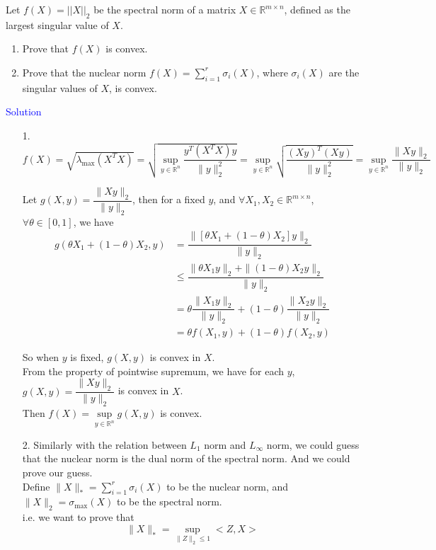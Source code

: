 Let $f(X) = ||X||_2$ be the spectral norm of a matrix $X \in \mathbb{R}^{m \times n}$, defined as the largest singular value of $X$.
\begin{enumerate}
\item Prove that $f(X)$ is convex. 

\item Prove that the nuclear norm $f(X) = \sum_{i=1}^{r} \sigma_i(X)$, where $\sigma_i(X)$ are the singular values of $X$, is convex. 
\end{enumerate}

\textcolor{blue}{Solution}

\begin{itemize}
\item[1.] $f(X)=\sqrt{\lambda_{\max}(X^TX)} = \sqrt{\sup\limits_{y\in\mathbb{R}^n}\dfrac{y^T(X^TX)y}{\|y\|_2^2}}= \sup\limits_{y\in\mathbb{R}^n}\sqrt{\dfrac{(Xy)^T(Xy)}{\|y\|_2^2}} = \sup\limits_{y\in\mathbb{R}^n}\dfrac{\|Xy\|_2}{\|y\|_2}$

Let $g(X,y)=\dfrac{\|Xy\|_2}{\|y\|_2}$, then for a fixed $y$, and $\forall X_1, X_2\in\mathbb{R}^{m\times n}$, $\forall \theta\in[0,1]$, we have
\begin{align*}
g(\theta X_1+(1-\theta)X_2,y) &= \dfrac{\|\left[\theta X_1+(1-\theta)X_2\right]y\|_2}{\|y\|_2} \\
&\leq \dfrac{\|\theta X_1y\|_2+\|(1-\theta)X_2y\|_2}{\|y\|_2} \\
&= \theta\dfrac{\|X_1y\|_2}{\|y\|_2}+(1-\theta)\dfrac{\|X_2y\|_2}{\|y\|_2} \\
&= \theta f(X_1,y)+(1-\theta)f(X_2,y)
\end{align*}

So when $y$ is fixed, $g(X,y)$ is convex in $X$.\\
From the property of pointwise supremum, we have for each $y$, $g(X,y)=\dfrac{\|Xy\|_2}{\|y\|_2}$ is convex in $X$. \\
Then $f(X)=\sup\limits_{y\in\mathbb{R}^n}g(X,y)$ is convex.


\item[2.] Similarly with the relation between $L_1$ norm and $L_{\infty}$ norm, we could guess that the nuclear norm is the dual norm of the spectral norm. And we could prove our guess. \\
Define $\|X\|_*=\sum\limits_{i=1}^{r}\sigma_i(X)$ to be the nuclear norm, and $\|X\|_2=\sigma_{\max}(X)$ to be the spectral norm. \\
i.e. we want to prove that
$$\|X\|_* = \sup_{\|Z\|_2 \leq 1} <Z,X>$$


\end{itemize}
